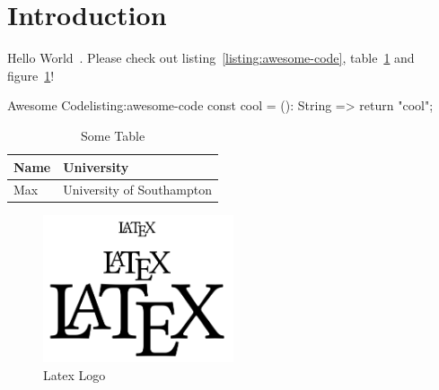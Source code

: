 \documentclass[12pt,a4paper]{article} %
\begin{document}

\newpage
\tableofcontents


\newpage
\renewcommand{\listfigurename}{Figures}
\listoffigures \thispagestyle{fancy}

\newpage
\renewcommand{\listtablename}{Tables}
\listoftables \thispagestyle{fancy}

\newpage
\renewcommand{\lstlistlistingname}{Code Listings}
\lstlistoflistings \thispagestyle{fancy}



\newpage
\section{Introduction}\label{sec:introduction}

Hello World~\cite{React}.
Please check out listing~\ref{listing:awesome-code}, table~\ref{tab:mytable} and figure~\ref{fig:latex-logo}!

\begin{code}{Awesome Code}{listing:awesome-code}
const cool = (): String => {
	return "cool";
}
\end{code}

\begin{table}[!ht]
	\begin{tabularx}{\textwidth}{|l|X|}
		\hline
		\textbf{Name} & \textbf{University} \\
		\hline
		Max & University of Southampton \\
		\hline
	\end{tabularx}
	\caption{Some Table}
	\label{tab:mytable}
\end{table}

\begin{figure}[!ht]
	\centering
	\includegraphics[width=0.5\textwidth]{latex.png}
	\caption{Latex Logo}
	\label{fig:latex-logo}
\end{figure}
\end{document}
